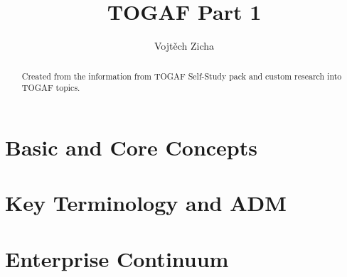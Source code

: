 \documentclass[twoside,12pt]{article}
\title{TOGAF Part 1}
\author{Vojtěch Zicha}
\begin{document}
\maketitle\thispagestyle{mypagestyle}

\begin{abstract}
\begin{markdown}
Created from the information from TOGAF Self-Study pack and custom research into TOGAF topics.
\end{markdown}
\end{abstract}

\begin{markdown}

\tableofcontents

\clearpage
\section{Basic and Core Concepts}

\section{Key Terminology and ADM}

\section{Enterprise Continuum}

\end{markdown}
\end{document}
